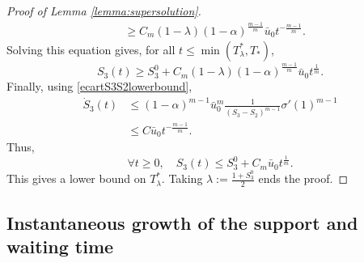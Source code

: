 \documentclass[11pt]{article}
\numberwithin{equation}{section} %
\newcommand{\al}{\alpha}
\newcommand{\la}{\lambda}
\begin{document}
\begin{proof}[Proof of Lemma \ref{lemma:supersolution}]
\begin{align*}
    &\ge C_m (1-\la )(1-\al)^\frac{m-1}{m}\bar u_0 t^{-\frac{m-1}{m}}.
\end{align*}
Solving this equation gives, for all $t\le \min(T_\la^*, T_*)$,
\begin{equation*}
    S_3(t) \ge S_3^0 + C_m (1-\la )(1-\al)^\frac{m-1}{m}\bar u_0t^\frac{1}{m}.
\end{equation*}
Finally, using \eqref{ecartS3S2lowerbound},
\begin{align*}
    \dot S_3(t)& \le (1-\al)^{m-1}\bar u_0^m \frac{1 }{(S_3-S_2)^{m-1}}\sigma'(1)^{m-1} \\
    &\le C \bar u_0 t^{-\frac{m-1}{m}}.
\end{align*}
Thus, 
\begin{equation*}
   \forall t\ge 0,\quad  S_3(t) \le S_3^0 + C_m \bar u_0 t^\frac{1}{m}.
\end{equation*}
This gives a lower bound on $T_\la^*$. Taking $\displaystyle \la := \frac{1+S_3^0}{2}$ ends the proof.
\end{proof}
 

\subsection{Instantaneous growth of the support and waiting time}
\end{document}
